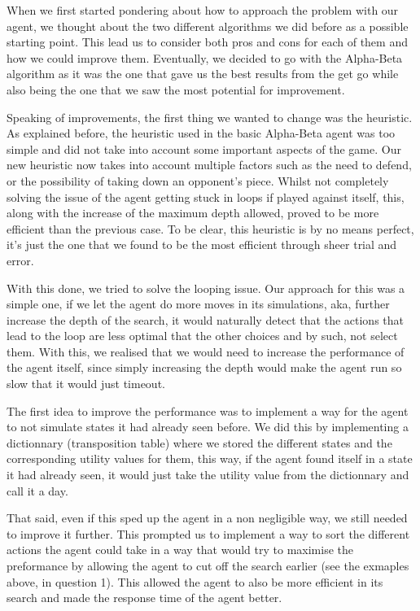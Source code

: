 \documentclass[11pt,a4paper]{report}
\begin{document}
\begin{answers}[21cm]
    When we first started pondering about how to approach the problem with our agent, we thought about the two different algorithms 
    we did before as a possible starting point. This lead us to consider both pros and cons for each of them and how we could improve them.
    Eventually, we decided to go with the Alpha-Beta algorithm as it was the one that gave us the best results from the get go
    while also being the one that we saw the most potential for improvement. 
    
    Speaking of improvements, the first thing we wanted to change was the heuristic. As explained before, the heuristic
    used in the basic Alpha-Beta agent was too simple and did not take into account some important aspects of the game. 
    Our new heuristic now takes into account multiple factors such as the need to defend, or the possibility of taking down
    an opponent's piece. Whilst not completely solving the issue of the agent getting stuck in loops if played against itself,
    this, along with the increase of the maximum depth allowed, proved to be more efficient than the previous case.
    To be clear, this heuristic is by no means perfect, it's just the one that we found to be the most efficient through
    sheer trial and error.

    With this done, we tried to solve the looping issue. Our approach for this was a simple one, if we let the agent do more 
    moves in its simulations, aka, further increase the depth of the search, it would naturally detect that the actions that lead to 
    the loop are less optimal that the other choices and by such, not select them. With this, we realised that we would need to 
    increase the performance of the agent itself, since simply increasing the depth would make the agent run so slow that it would
    just timeout. 

    The first idea to improve the performance was to implement a way for the agent to not simulate states it had already seen before. 
    We did this by implementing a dictionnary (transposition table) where we stored the different states and the corresponding utility values for them, 
    this way, if the agent found itself in a state it had already seen, it would just take the utility value from the dictionnary and
    call it a day.

    That said, even if this sped up the agent in a non negligible way, we still needed to improve it further. This prompted us to 
    implement a way to sort the different actions the agent could take in a way that would try to maximise the preformance 
    by allowing the agent to cut off the search earlier (see the exmaples above, in question 1). 
    This allowed the agent to also be more efficient in its search and made the response time of the agent better. 


\end{answers}
\end{document}
